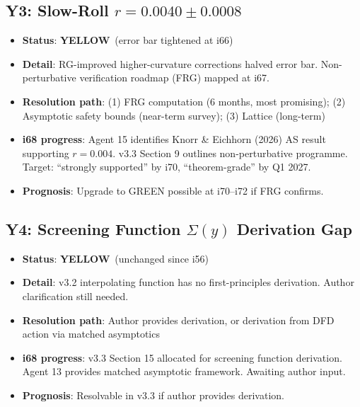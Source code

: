 \documentclass[11pt,a4paper]{article}
\newcommand{\YELLOW}{\textcolor{dfdyellow}{\textbf{YELLOW}}}
\begin{document}
\subsection{Y3: Slow-Roll $r = 0.0040 \pm 0.0008$}
\begin{itemize}[nosep]
\item \textbf{Status}: \YELLOW\ (error bar tightened at i66)
\item \textbf{Detail}: RG-improved higher-curvature corrections halved error bar. Non-perturbative verification roadmap (FRG) mapped at i67.
\item \textbf{Resolution path}: (1) FRG computation (6 months, most promising); (2) Asymptotic safety bounds (near-term survey); (3) Lattice (long-term)
\item \textbf{i68 progress}: Agent 15 identifies Knorr \& Eichhorn (2026) AS result supporting $r = 0.004$. v3.3 Section 9 outlines non-perturbative programme. Target: ``strongly supported'' by i70, ``theorem-grade'' by Q1 2027.
\item \textbf{Prognosis}: Upgrade to GREEN possible at i70--i72 if FRG confirms.
\end{itemize}

\subsection{Y4: Screening Function $\Sigma(y)$ Derivation Gap}
\begin{itemize}[nosep]
\item \textbf{Status}: \YELLOW\ (unchanged since i56)
\item \textbf{Detail}: v3.2 interpolating function has no first-principles derivation. Author clarification still needed.
\item \textbf{Resolution path}: Author provides derivation, or derivation from DFD action via matched asymptotics
\item \textbf{i68 progress}: v3.3 Section 15 allocated for screening function derivation. Agent 13 provides matched asymptotic framework. Awaiting author input.
\item \textbf{Prognosis}: Resolvable in v3.3 if author provides derivation.
\end{itemize}
\end{document}

